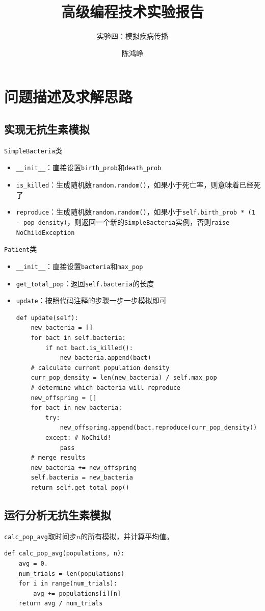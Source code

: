 \documentclass[logo,reportComp]{thesis}
\title{高级编程技术实验报告}
\subtitle{实验四：模拟疾病传播}
\author{陈鸿峥}
\begin{document}
\maketitle

\section{问题描述及求解思路}
\subsection{实现无抗生素模拟}
\verb'SimpleBacteria'类
\begin{itemize}
	\item \verb'__init__'：直接设置\verb'birth_prob'和\verb'death_prob'
	\item \verb'is_killed'：生成随机数\verb'random.random()'，如果小于死亡率，则意味着已经死了
	\item \verb'reproduce'：生成随机数\verb'random.random()'，如果小于\verb'self.birth_prob * (1 - pop_density)'，则返回一个新的\verb'SimpleBacteria'实例，否则\verb'raise NoChildException'
\end{itemize}

\verb'Patient'类
\begin{itemize}
	\item \verb'__init__'：直接设置\verb'bacteria'和\verb'max_pop'
	\item \verb'get_total_pop'：返回\verb'self.bacteria'的长度
	\item \verb'update'：按照代码注释的步骤一步一步模拟即可
\begin{lstlisting}
def update(self):
    new_bacteria = []
    for bact in self.bacteria:
        if not bact.is_killed():
            new_bacteria.append(bact)
    # calculate current population density
    curr_pop_density = len(new_bacteria) / self.max_pop
    # determine which bacteria will reproduce
    new_offspring = []
    for bact in new_bacteria:
        try:
            new_offspring.append(bact.reproduce(curr_pop_density))
        except: # NoChild!
            pass
    # merge results
    new_bacteria += new_offspring
    self.bacteria = new_bacteria
    return self.get_total_pop()
\end{lstlisting}
\end{itemize}

\subsection{运行分析无抗生素模拟}
\verb'calc_pop_avg'取时间步$n$的所有模拟，并计算平均值。
\begin{lstlisting}
def calc_pop_avg(populations, n):
    avg = 0.
    num_trials = len(populations)
    for i in range(num_trials):
        avg += populations[i][n]
    return avg / num_trials
\end{lstlisting}
\end{document}
